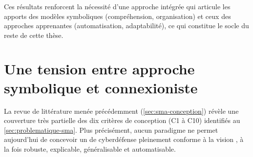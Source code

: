 

Ces résultats renforcent la nécessité d'une approche intégrée qui articule les apports des modèles symboliques (compréhension, organisation) et ceux des approches apprenantes (automatisation, adaptabilité), ce qui constitue le socle du reste de cette thèse.


\section{Une tension entre approche symbolique et connexioniste}\label{sec:limits-existing}

La revue de littérature menée précédemment (\autoref{sec:sma-conception}) révèle une couverture très partielle des dix critères de conception (C1 à C10) identifiés au \autoref{sec:problematique-sma}. Plus précisément, aucun paradigme ne permet aujourd'hui de concevoir un  de cyberdéfense pleinement conforme à la vision , à la fois robuste, explicable, généralisable et automatisable.

